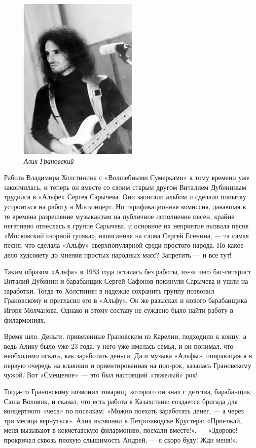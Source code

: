 \documentclass[16pt,a5paper,oneside]{book}
\begin{document}
\begin{figure}
    \centering
    \includegraphics[scale=0.9]{Image09}
    \caption{\textit{Алик Грановский}}
\end{figure}

Работа Владимира Холстинина с «Волшебными Сумерками» к тому времени уже закончилась, и теперь он вместе со своим старым
другом Виталием Дубининым трудился в «Альфе» Сергея Сарычева. Они записали альбом и сделали попытку устроиться на работу
в Москонцерт. Но тарификационная комиссия, дававшая в те времена разрешение музыкантам на публичное исполнение песен,
крайне негативно отнеслась к группе Сарычева, и основное их неприятие вызвала песня «Московский озорной гуляка»,
написанная на слова Сергей Есенина, — та самая песня, что сделала «Альфу» сверхпопулярной среди простого народа. Но
какое дело худсовету до мнения простых народных масс? Запретить — и все тут!

Таким образом «Альфа» в 1983 года осталась без работы, из-за чего бас-гитарист Виталий Дубинин и барабанщик Сергей
Сафонов покинули Сарычева и ушли на заработки. Тогда-то Холстинин в надежде сохранить группу позвонил Грановскому и
пригласил его в «Альфу». Он же разыскал и нового барабанщика Игоря Молчанова. Однако и этому составу не суждено было
найти работу в филармониях.

Время шло. Деньги, привезенные Грановским из Карелии, подходили к концу, а ведь Алику было уже 23 года, у него уже
имелась семья, и он понимал, что необходимо искать, как заработать деньги. Да и музыка «Альфы», опирающаяся в первую
очередь на клавиши и ориентированная на поп-рок, казалась Грановскому чужой. Вот «Смещение» — это был настоящий
«тяжелый» рок!

Тогда-то Грановскому позвонил товарищ, которого он знал с детства, барабанщик Саша Воловик, и сказал, что есть работа в
Казахстане: создается бригада для концертного «чеса» по поселкам: «Можно поехать заработать денег, — а через три месяца
вернуться». Алик вызвонил в Петрозаводске Крустера: «Приезжай, меня вызывают в кокчетавскую филармонию, поехали
вместе!». — «Здорово! — прокричал сквозь плохую слышимость Андрей, — я скоро буду! Жди меня!».
\end{document}
